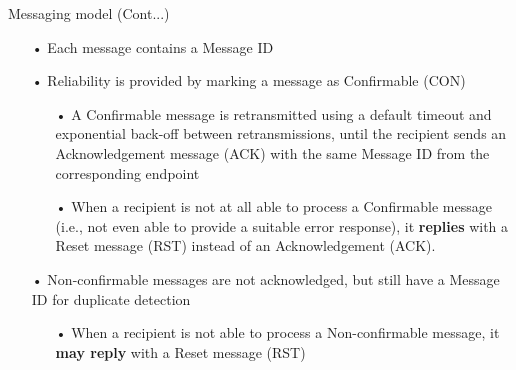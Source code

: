 \documentclass[11pt]{beamer}
\begin{document}
\begin{frame}{Messaging model (Cont...)}
\begin{itemize}
\item[•] Each message contains a Message ID 
\item[•] Reliability is provided by marking a message as Confirmable (CON)
\begin{itemize}
\item[•] A Confirmable message is retransmitted using a default timeout and exponential back-off between retransmissions, until the recipient sends an Acknowledgement message (ACK) with the same Message ID from the corresponding endpoint
\item[•] When a recipient is not at all able to process a Confirmable message (i.e., not even able to provide a suitable error response), it \textbf{replies} with a Reset message (RST) instead of an Acknowledgement (ACK).
\end{itemize}
\item[•] Non-confirmable messages are not acknowledged, but still have a Message ID for duplicate detection
\begin{itemize}
\item[•] When a recipient is not able to process a Non-confirmable message, it \textbf{may reply} with a Reset message (RST)
\end{itemize}
\end{itemize}
\end{frame}
\end{document}
